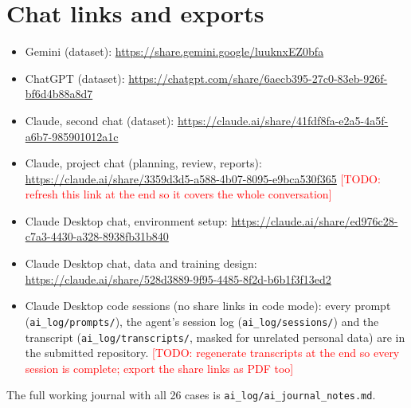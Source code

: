 \documentclass[11pt,a4paper]{article}
\newcommand{\todo}[1]{\textcolor{red}{[TODO: #1]}}
\begin{document}
\appendix
\section{Chat links and exports}
\begin{itemize}\small
\item Gemini (dataset): \url{https://share.gemini.google/luuknxEZ0bfa}
\item ChatGPT (dataset): \url{https://chatgpt.com/share/6aecb395-27c0-83eb-926f-bf6d4b88a8d7}
\item Claude, second chat (dataset): \url{https://claude.ai/share/41fdf8fa-e2a5-4a5f-a6b7-985901012a1c}
\item Claude, project chat (planning, review, reports): \url{https://claude.ai/share/3359d3d5-a588-4b07-8095-e9bca530f365}
\todo{refresh this link at the end so it covers the whole conversation}
\item Claude Desktop chat, environment setup: \url{https://claude.ai/share/ed976c28-c7a3-4430-a328-8938fb31b840}
\item Claude Desktop chat, data and training design:\\ \url{https://claude.ai/share/528d3889-9f95-4485-8f2d-b6b1f3f13ed2}
\item Claude Desktop code sessions (no share links in code mode): every prompt
(\texttt{ai\_log/prompts/}), the agent's session log (\texttt{ai\_log/sessions/}) and the transcript
(\texttt{ai\_log/transcripts/}, masked for unrelated personal data) are in the submitted repository.
\todo{regenerate transcripts at the end so every session is complete; export the share links as PDF too}
\end{itemize}
The full working journal with all 26 cases is \texttt{ai\_log/ai\_journal\_notes.md}.
\end{document}
